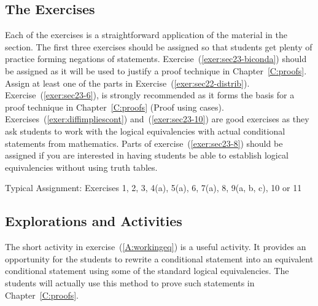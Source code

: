 \subsection*{The Exercises}

Each of the exercises is a straightforward application of the material in the section.  The first three exercises should be assigned so that students get plenty of practice forming negations of statements.  Exercise~(\ref{exer:sec23-biconda}) should be assigned as it will be used to justify a proof technique in Chapter~\ref{C:proofs}.  Assign at least one of the parts in 
Exercise~(\ref{exer:sec22-distrib}).  Exercise~(\ref{exer:sec23-6}), 
is strongly recommended as it forms the basis for a proof technique in Chapter~\ref{C:proofs} (Proof using cases).  Exercises~(\ref{exer:diffimpliescont}) and~(\ref{exer:sec23-10}) are good exercises as they ask students to work with the logical equivalencies with actual conditional statements from mathematics.   Parts of exercise~(\ref{exer:sec23-8}) should be assigned if you are interested in having students be able to establish logical equivalencies without using truth tables.

\vskip6pt
\noindent
Typical Assignment:  Exercises 1, 2, 3, 4(a), 5(a), 6, 7(a), 8, 9(a, b, c), 10 or 11
\hbreak


\subsection*{Explorations and Activities}

The short activity in exercise~(\ref{A:workingeq}) is a useful activity.  It provides an opportunity for the students to rewrite a conditional statement into an equivalent conditional statement using some of the standard logical equivalencies.  The students will actually use this method to prove such statements in Chapter~\ref{C:proofs}.

\hbreak


\endinput
